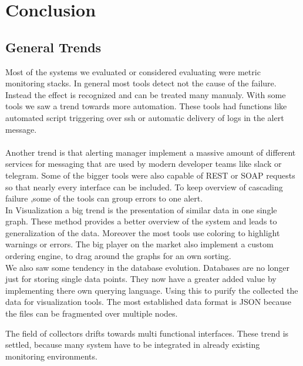
\chapter{Conclusion}\label{chap:conclusion}
\section{General Trends}
Most of the systems we evaluated or considered evaluating were metric monitoring stacks. In general most tools detect not the cause of the failure. Instead the effect is recognized and can be treated many manualy. With some tools we saw a trend towards more automation. These tools had functions like automated script triggering over ssh or automatic delivery of logs in the alert message. \\
\\
Another trend is that alerting manager implement a massive amount of different services for messaging that are used by modern developer teams like slack or telegram. Some of the bigger tools were also capable of REST or SOAP requests so that nearly every interface can be included. To keep overview of cascading failure ,some of the tools can group errors to one alert.
\\
In Visualization a big trend is the presentation of similar data in one single graph. These method provides a better overview of the system and leads to generalization of the data. Moreover the most tools use coloring to highlight warnings or errors. The big player on the market also implement a custom ordering engine, to drag around the graphs for an own sorting.
\\
We also saw some tendency in the database evolution. Databases are no longer just for storing single data points. They now have a greater added value by implementing there own querying language. Using this to purify the collected the data for visualization tools. The most established data format is JSON because the files can be fragmented over multiple nodes.

The field of collectors drifts towards multi functional interfaces. These trend is settled, because many system have to be integrated in already existing monitoring environments. 
